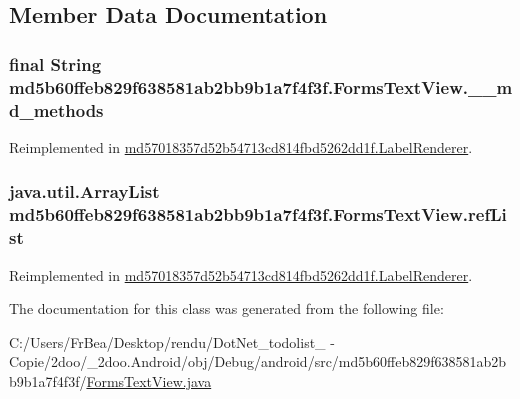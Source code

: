 \subsection{Member Data Documentation}
\hypertarget{classmd5b60ffeb829f638581ab2bb9b1a7f4f3f_1_1_forms_text_view_d4f9b582e68f2509120a1f5414c09541}{
\subsubsection[{\_\-\_\-md\_\-methods}]{\setlength{\rightskip}{0pt plus 5cm}final String {\bf md5b60ffeb829f638581ab2bb9b1a7f4f3f.FormsTextView.\_\-\_\-md\_\-methods}}}
\label{classmd5b60ffeb829f638581ab2bb9b1a7f4f3f_1_1_forms_text_view_d4f9b582e68f2509120a1f5414c09541}




Reimplemented in \hyperlink{classmd57018357d52b54713cd814fbd5262dd1f_1_1_label_renderer_cbf8d2cb7c72ee5391f580882a66080f}{md57018357d52b54713cd814fbd5262dd1f.LabelRenderer}.\hypertarget{classmd5b60ffeb829f638581ab2bb9b1a7f4f3f_1_1_forms_text_view_3da090ab0eccaeff99e949ea5d81c1b2}{
\subsubsection[{refList}]{\setlength{\rightskip}{0pt plus 5cm}java.util.ArrayList {\bf md5b60ffeb829f638581ab2bb9b1a7f4f3f.FormsTextView.refList}}}
\label{classmd5b60ffeb829f638581ab2bb9b1a7f4f3f_1_1_forms_text_view_3da090ab0eccaeff99e949ea5d81c1b2}




Reimplemented in \hyperlink{classmd57018357d52b54713cd814fbd5262dd1f_1_1_label_renderer_95ad3ee6fcc2a2fd40aee083882fac72}{md57018357d52b54713cd814fbd5262dd1f.LabelRenderer}.

The documentation for this class was generated from the following file:\begin{CompactItemize}
\item 
C:/Users/FrBea/Desktop/rendu/DotNet\_\-todolist\_ - Copie/2doo/\_\-2doo.Android/obj/Debug/android/src/md5b60ffeb829f638581ab2bb9b1a7f4f3f/\hyperlink{_forms_text_view_8java}{FormsTextView.java}\end{CompactItemize}
